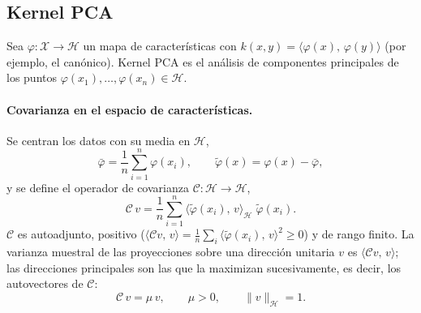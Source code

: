\documentclass[11pt,a4paper]{article}
\newcommand{\X}{\mathcal{X}}
\newcommand{\Hk}{\mathcal{H}}
\newcommand{\inner}[2]{\langle #1,\, #2\rangle}
\newcommand{\norm}[1]{\lVert #1\rVert}
\theoremstyle{plain}
\theoremstyle{definition}
\theoremstyle{remark}
\numberwithin{equation}{section}
\begin{document}
\subsection{Kernel PCA}\label{sec:kpca}

Sea $\varphi\colon\X\to\Hk$ un mapa de características con
$k(x,y)=\inner{\varphi(x)}{\varphi(y)}$ (por ejemplo, el canónico). Kernel PCA
\cite{scholkopf1998} es el análisis de componentes principales de los puntos
$\varphi(x_1),\dots,\varphi(x_n)\in\Hk$.

\paragraph{Covarianza en el espacio de características.} Se centran los datos con su media
en $\Hk$,
\begin{equation}\label{eq:centered-features}
  \bar\varphi=\frac1n\sum_{i=1}^n\varphi(x_i),\qquad\tilde\varphi(x)=\varphi(x)-\bar\varphi,
\end{equation}
y se define el operador de covarianza $\mathcal C\colon\Hk\to\Hk$,
\begin{equation}\label{eq:covariance-operator}
  \mathcal C\,v=\frac1n\sum_{i=1}^n\inner{\tilde\varphi(x_i)}{v}_{\Hk}\;\tilde\varphi(x_i).
\end{equation}
$\mathcal C$ es autoadjunto, positivo
($\inner{\mathcal Cv}{v}=\frac1n\sum_i\inner{\tilde\varphi(x_i)}{v}^2\ge0$) y de rango finito.
La varianza muestral de las proyecciones sobre una dirección unitaria $v$ es
$\inner{\mathcal Cv}{v}$; las direcciones principales son las que la maximizan
sucesivamente, es decir, los autovectores de $\mathcal C$:
\begin{equation}\label{eq:kpca-eigenproblem}
  \mathcal C\,v=\mu\,v,\qquad\mu>0,\qquad\norm{v}_{\Hk}=1 .
\end{equation}
\end{document}
